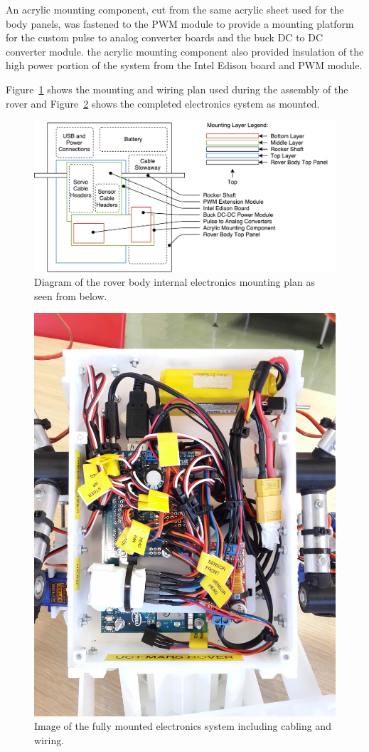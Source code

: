       An acrylic mounting component, cut from the same acrylic sheet used for the body panels, was fastened to the PWM module to provide a mounting platform for the custom pulse to analog converter boards and the buck DC to DC converter module. the acrylic mounting component also provided insulation of the high power portion of the system from the Intel Edison board and PWM module.
      
      Figure~\ref{fig:mechBuild-internalElectronicsMountingPlan} shows the mounting and wiring plan used during the assembly of the rover and Figure~\ref{fig:mechBuild-internalElectronics} shows the completed electronics system as mounted.
      
      \begin{figure}[h!]
        \centering
        \includegraphics[width=0.9\linewidth]{figures/mechBuild-internalElectronicsMountingPlan}
        \caption[Diagram of the rover body internal electronics mounting plan as seen from below.]{Diagram of the rover body internal electronics mounting plan as seen from below.}
        \label{fig:mechBuild-internalElectronicsMountingPlan}
      \end{figure}
      
      \begin{figure}[h!]
        \centering
        \includegraphics[angle=270, width=0.5\linewidth]{figures/mechBuild-internalElectronics}
        \caption[Image of the fully mounted electronics system including cabling and wiring.]{Image of the fully mounted electronics system including cabling and wiring.}
        \label{fig:mechBuild-internalElectronics}
      \end{figure}
      
